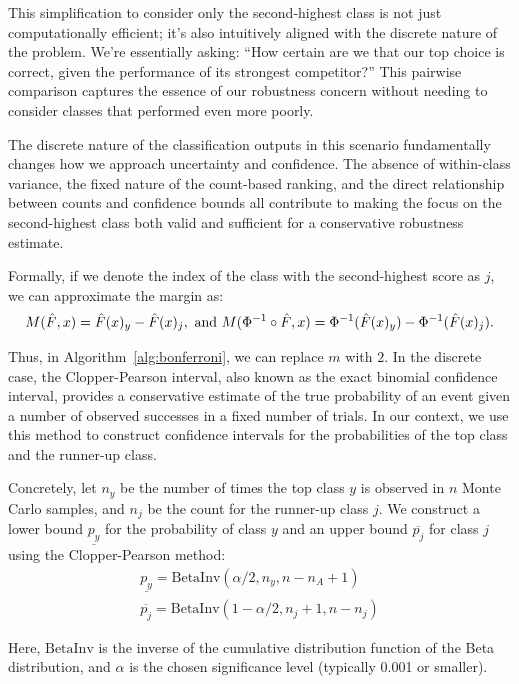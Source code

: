 This simplification to consider only the second-highest class is not just computationally efficient; it's also intuitively aligned with the discrete nature of the problem.
We're essentially asking: ``How certain are we that our top choice is correct, given the performance of its strongest competitor?'' This pairwise comparison captures the essence of our robustness concern without needing to consider classes that performed even more poorly.

The discrete nature of the classification outputs in this scenario fundamentally changes how we approach uncertainty and confidence.
The absence of within-class variance, the fixed nature of the count-based ranking, and the direct relationship between counts and confidence bounds all contribute to making the focus on the second-highest class both valid and sufficient for a conservative robustness estimate.

Formally, if we denote the index of the class with the second-highest score as $j$, we can approximate the margin as:
\begin{align*}
    M(\Hat{F},x) =\Hat{F}(x)_{y} - \Hat{F}(x)_j, \text{ and }M(\Phi^{-1}\circ\Hat{F},x) =\Phi^{-1}(\Hat{F}(x)_{y}) - \Phi^{-1}(\Hat{F}(x)_j).
\end{align*}

Thus, in Algorithm~\ref{alg:bonferroni}, we can replace $m$ with $2$.
In the discrete case, the Clopper-Pearson interval, also known as the exact binomial confidence interval, provides a conservative estimate of the true probability of an event given a number of observed successes in a fixed number of trials.
In our context, we use this method to construct confidence intervals for the probabilities of the top class and the runner-up class.

Concretely, let $n_y$ be the number of times the top class $y$ is observed in $n$ Monte Carlo samples, and $n_j$ be the count for the runner-up class $j$.
We construct a lower bound $\underline{p_y}$ for the probability of class $y$ and an upper bound $\overline{p_j}$ for class $j$ using the Clopper-Pearson method:
\begin{gather*}
    \underline{p_y} = \text{BetaInv}(\alpha/2, n_y, n - n_A + 1)\\
    \overline{p_j} = \text{BetaInv}(1-\alpha/2, n_j + 1, n - n_j)
\end{gather*}

Here, $\text{BetaInv}$ is the inverse of the cumulative distribution function of the Beta distribution, and $\alpha$ is the chosen significance level (typically 0.001 or smaller).

